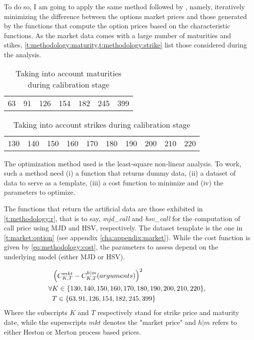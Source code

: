 \documentclass[12pt]{report}
\begin{document}
To do so, I am going to apply the same method followed by \citet{criso2015}, namely, iteratively minimizing the difference between the options market prices and those generated by the functions that compute the option prices based on the characteristic functions.
As the market data comes with a large number of maturities and stikes, \cref{t:methodology:maturity,t:methodology:strike} list those considered during the analysis.

\begin{table}[ht]
\centering
\begin{tabular}{lllllll}
  63 & 91 & 126 & 154 & 182 & 245 & 399 \\
\end{tabular}
\caption{Taking into account maturities during calibration stage} 
\label{t:methodology:maturity}
\end{table}

\begin{table}[ht]
\centering
\begin{tabular}{llllllllll}
  130 & 140 & 150 & 160 & 170 & 180 & 190 & 200 & 210 & 220 \\  
\end{tabular}
\caption{Taking into account strikes during calibration stage} 
\label{t:methodology:strike}
\end{table}

The optimization method used is the least-square non-linear analysis. 
To work, such a method need (i) a function that returns dummy data, (ii) a dataset of data to serve as a template, (iii) a cost function to minimize and (iv) the parameters to optimize.

The functions that return the artificial data are those exhibited in \cref{t:methodology:r}, that is to say, \textit{mjd\_call} and \textit{hsv\_call} for the computation of call price using MJD and HSV, respectively.
The dataset template is the one in \cref{t:market:option} (see appendix \ref{cha:appendix:market}).
While the cost function is given by \cref{eq:methodology:cost}, the parameters to assess depend on the underlying model (either MJD or HSV).

\begin{align}
 &\left(C_{K,T}^{mkt} - C_{K,T}^{h|m}(arguments)\right)^2
 \label{eq:methodology:cost}\\
 \forall &K \in \{130, 140, 150, 160, 170, 180, 190, 200, 210, 220\}, \notag\\
 &T \in \left \{63, 91, 126, 154, 182, 245, 399\right \}\notag 
\end{align}
Where the subscripts $K$ and $T$ respectively stand for strike price and maturity date, while the superscripts $mkt$ denotes the "market price" and $h|m$ refers to either Heston or Merton process based prices.
\end{document}
